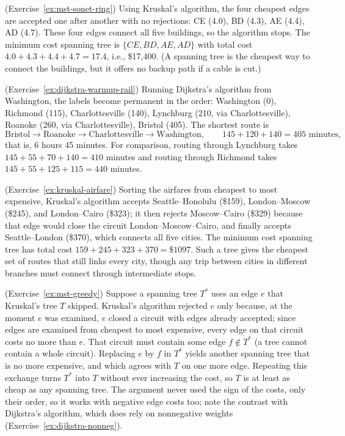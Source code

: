 \begin{solution}(Exercise~\ref{ex:mst-sonet-ring})
Using Kruskal's algorithm, the four cheapest edges are accepted one after another with no rejections: CE (4.0), BD (4.3), AE (4.4), AD (4.7).  These four edges connect all five buildings, so the algorithm stops.  The minimum cost spanning tree is $\{CE, BD, AE, AD\}$ with total cost $4.0 + 4.3 + 4.4 + 4.7 = 17.4$, i.e., \$17{,}400.  (A spanning tree is the cheapest way to connect the buildings, but it offers no backup path if a cable is cut.)
\end{solution}

\begin{solution}(Exercise~\ref{ex:dijkstra-warmup-rail})
Running Dijkstra's algorithm from Washington, the labels become permanent in the order: Washington (0), Richmond (115), Charlottesville (140), Lynchburg (210, via Charlottesville), Roanoke (260, via Charlottesville), Bristol (405).  The shortest route is
\[
\text{Bristol} \to \text{Roanoke} \to \text{Charlottesville} \to \text{Washington},
\qquad 145 + 120 + 140 = 405 \text{ minutes},
\]
that is, 6 hours 45 minutes.  For comparison, routing through Lynchburg takes $145 + 55 + 70 + 140 = 410$ minutes and routing through Richmond takes $145 + 55 + 125 + 115 = 440$ minutes.
\end{solution}

\begin{solution}(Exercise~\ref{ex:kruskal-airfare})
Sorting the airfares from cheapest to most expensive, Kruskal's algorithm accepts Seattle--Honolulu (\$159), London--Moscow (\$245), and London--Cairo (\$323); it then rejects Moscow--Cairo (\$329) because that edge would close the circuit London--Moscow--Cairo, and finally accepts Seattle--London (\$370), which connects all five cities.  The minimum cost spanning tree has total cost $159 + 245 + 323 + 370 = \$1097$.  Such a tree gives the cheapest set of routes that still links every city, though any trip between cities in different branches must connect through intermediate stops.
\end{solution}

\begin{solution}(Exercise~\ref{ex:mst-greedy})
Suppose a spanning tree $T^*$ uses an edge $e$ that Kruskal's tree $T$ skipped.  Kruskal's algorithm rejected $e$ only because, at the moment $e$ was examined, $e$ closed a circuit with edges already accepted; since edges are examined from cheapest to most expensive, every edge on that circuit costs no more than $e$.  That circuit must contain some edge $f \notin T^*$ (a tree cannot contain a whole circuit).  Replacing $e$ by $f$ in $T^*$ yields another spanning tree that is no more expensive, and which agrees with $T$ on one more edge.  Repeating this exchange turns $T^*$ into $T$ without ever increasing the cost, so $T$ is at least as cheap as any spanning tree.  The argument never used the sign of the costs, only their order, so it works with negative edge costs too; note the contrast with Dijkstra's algorithm, which does rely on nonnegative weights (Exercise~\ref{ex:dijkstra-nonneg}).
\end{solution}

